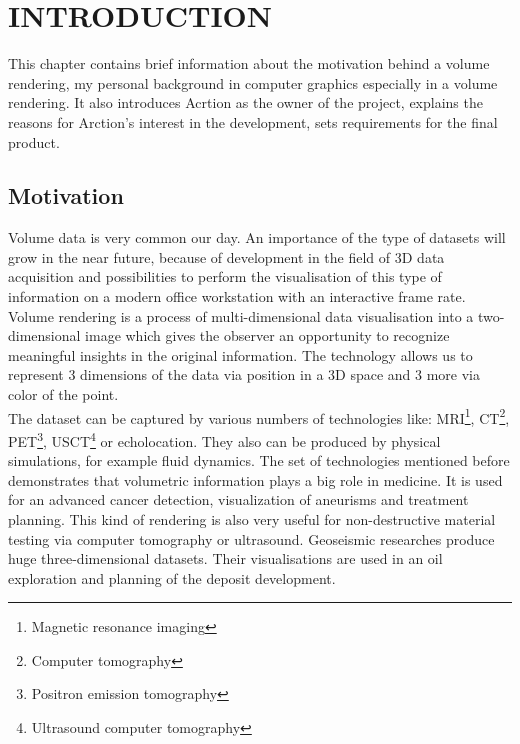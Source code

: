 \documentclass[twoside, english, 11pt]{report}
\begin{document}
\newpage

\tableofcontents

\chapter{INTRODUCTION}
This chapter contains brief information about the motivation behind a volume rendering, my personal background in computer graphics especially in a volume rendering. It also introduces Acrtion as the owner of the project, explains the reasons for Arction's interest in the development, sets requirements for the final product.
\section{Motivation}

Volume data is very common our day. An importance of the type of datasets will grow in the near future, because of development in the field of 3D data acquisition and possibilities to perform the visualisation of this type of information on a modern office workstation with an interactive frame rate.\\

Volume rendering is a process of multi-dimensional data visualisation into a two-dimensional image which gives the observer an opportunity to recognize meaningful insights in the original information. The technology allows us to represent 3 dimensions of the data via position in a 3D space and 3 more via color of the point.\\

The dataset can be captured by various numbers of technologies like: MRI\footnote{Magnetic resonance imaging}, CT\footnote{Computer tomography}, PET\footnote{Positron emission tomography}, USCT\footnote{Ultrasound computer tomography} or echolocation. They also can be produced by physical simulations, for example fluid dynamics. The set of technologies mentioned before demonstrates that volumetric information plays a big role in medicine. It is used for an advanced cancer detection, visualization of aneurisms and treatment planning. This kind of rendering is also very useful for non-destructive material testing via computer tomography or ultrasound. Geoseismic researches produce huge three-dimensional datasets. Their visualisations are used in an oil exploration and planning of the deposit development.\\
\end{document}
